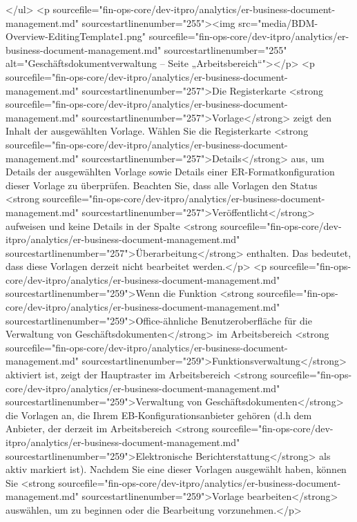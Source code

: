 </ul>
<p sourcefile="fin-ops-core/dev-itpro/analytics/er-business-document-management.md" sourcestartlinenumber="255"><img src="media/BDM-Overview-EditingTemplate1.png" sourcefile="fin-ops-core/dev-itpro/analytics/er-business-document-management.md" sourcestartlinenumber="255" alt="Geschäftsdokumentverwaltung – Seite „Arbeitsbereich“"></p>
<p sourcefile="fin-ops-core/dev-itpro/analytics/er-business-document-management.md" sourcestartlinenumber="257">Die Registerkarte <strong sourcefile="fin-ops-core/dev-itpro/analytics/er-business-document-management.md" sourcestartlinenumber="257">Vorlage</strong> zeigt den Inhalt der ausgewählten Vorlage. Wählen Sie die Registerkarte <strong sourcefile="fin-ops-core/dev-itpro/analytics/er-business-document-management.md" sourcestartlinenumber="257">Details</strong> aus, um Details der ausgewählten Vorlage sowie Details einer ER-Formatkonfiguration dieser Vorlage zu überprüfen. Beachten Sie, dass alle Vorlagen den Status <strong sourcefile="fin-ops-core/dev-itpro/analytics/er-business-document-management.md" sourcestartlinenumber="257">Veröffentlicht</strong> aufweisen und keine Details in der Spalte <strong sourcefile="fin-ops-core/dev-itpro/analytics/er-business-document-management.md" sourcestartlinenumber="257">Überarbeitung</strong> enthalten. Das bedeutet, dass diese Vorlagen derzeit nicht bearbeitet werden.</p>
<p sourcefile="fin-ops-core/dev-itpro/analytics/er-business-document-management.md" sourcestartlinenumber="259">Wenn die Funktion <strong sourcefile="fin-ops-core/dev-itpro/analytics/er-business-document-management.md" sourcestartlinenumber="259">Office-ähnliche Benutzeroberfläche für die Verwaltung von Geschäftsdokumenten</strong> im Arbeitsbereich <strong sourcefile="fin-ops-core/dev-itpro/analytics/er-business-document-management.md" sourcestartlinenumber="259">Funktionsverwaltung</strong> aktiviert ist, zeigt der Hauptraster im Arbeitsbereich <strong sourcefile="fin-ops-core/dev-itpro/analytics/er-business-document-management.md" sourcestartlinenumber="259">Verwaltung von Geschäftsdokumenten</strong> die Vorlagen an, die Ihrem EB-Konfigurationsanbieter gehören (d.h dem Anbieter, der derzeit im Arbeitsbereich <strong sourcefile="fin-ops-core/dev-itpro/analytics/er-business-document-management.md" sourcestartlinenumber="259">Elektronische Berichterstattung</strong> als aktiv markiert ist). Nachdem Sie eine dieser Vorlagen ausgewählt haben, können Sie <strong sourcefile="fin-ops-core/dev-itpro/analytics/er-business-document-management.md" sourcestartlinenumber="259">Vorlage bearbeiten</strong> auswählen, um zu beginnen oder die Bearbeitung vorzunehmen.</p>
